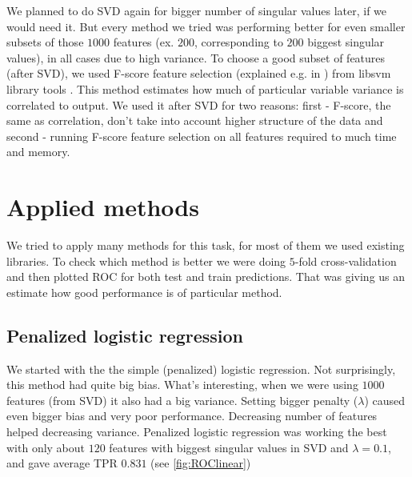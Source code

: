\documentclass[]{report}
\begin{document}
 We planned to do SVD again for bigger number of singular values later, if we would need it. But every method we tried was performing better for even smaller subsets of those $1000$ features (ex. $200$, corresponding to $200$ biggest singular values), in all cases due to high variance. To choose a good subset of features (after SVD), we used F-score feature selection (explained e.g. in \cite{fscore}) from libsvm library tools \cite{fselection}.
  This method estimates how much of particular variable variance  is correlated to output. We used it after SVD for two reasons: first - F-score, the same as correlation, don't take into account higher structure of the data and second - running F-score feature selection on all features required to much time and memory.


\section{Applied methods}
We tried to apply many methods for this task, for most of them we used existing libraries. To check which method is better we were doing $5$-fold cross-validation and then plotted ROC for both test and train predictions. That was giving us an estimate how good performance is of particular method.

\subsection{Penalized logistic regression}
We started with the the simple (penalized) logistic regression. Not surprisingly, this method had quite big bias. What's interesting, when we were using $1000$ features (from SVD) it also had a big variance. Setting bigger penalty ($\lambda$) caused even bigger bias and very poor performance. Decreasing number of features helped decreasing variance. Penalized logistic regression was working the best with only about $120$ features with biggest singular values in SVD and $\lambda = 0.1$, and gave average TPR $0.831$ (see \ref{fig:ROClinear})

\end{document}
